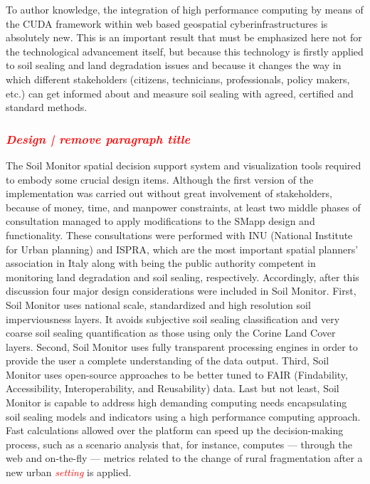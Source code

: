 \documentclass[APA,LATO1COL,doublespace]{WileyNJD-v2}
\newcommand{\toberevised}[1]{\emph{\textcolor{red}{#1}}} %
\begin{document}
To author knowledge, the
integration of high performance computing by means of the CUDA framework within web based geospatial cyberinfrastructures is absolutely new.
This is an important result that must be emphasized here not for the technological advancement itself, but because this technology is firstly applied to soil sealing and land degradation issues and because it changes the way in which different stakeholders (citizens, technicians, professionals, policy makers, etc.) can get informed about and measure soil sealing with agreed, certified and standard methods.

\subsubsection{ \toberevised{Design | remove paragraph title} }
The Soil Monitor spatial decision support system and visualization tools required to embody some crucial design items. 
Although the first version of the implementation was carried out without great involvement of stakeholders, because of money, time, and manpower constraints, at least two middle phases of consultation managed to apply modifications to the SMapp design and functionality. 
These consultations were performed with INU (National Institute for Urban planning) and ISPRA, which are the most important spatial planners' association in Italy along with being the public authority competent in monitoring land degradation and soil sealing, respectively.
Accordingly, after this discussion four major design considerations were included in Soil Monitor.
First, Soil Monitor uses national scale, standardized and high resolution soil imperviousness layers.
It avoids subjective soil sealing classification and very coarse soil sealing quantification as those using only the Corine Land Cover layers.
Second, Soil Monitor uses fully transparent processing engines in order to provide the user a complete understanding of the data output.
Third, Soil Monitor uses open-source approaches to be better tuned to FAIR (Findability, Accessibility, Interoperability, and Reusability) data.
Last but not least, Soil Monitor is capable to address high demanding computing needs encapsulating soil sealing models and indicators using a high performance computing approach.
Fast calculations allowed over the platform can speed up the decision-making process, such as a scenario analysis that, for instance, computes --- through the web and on-the-fly --- metrics related to the change of rural fragmentation after a new urban \toberevised{setting} is applied.
\end{document}
